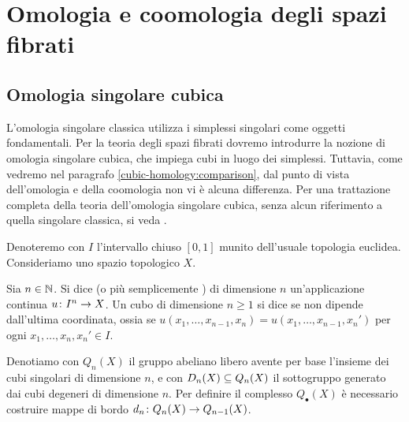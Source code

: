 \chapter{Omologia e coomologia degli spazi fibrati}
\label{ch:homology-and-cohomology-of-fibrations}
\section{Omologia singolare cubica}

L'omologia singolare classica utilizza i simplessi singolari come oggetti fondamentali. Per la teoria degli spazi fibrati dovremo introdurre la nozione di omologia singolare cubica, che impiega cubi in luogo dei simplessi. Tuttavia, come vedremo nel paragrafo \ref{cubic-homology:comparison}, dal punto di vista dell'omologia e della coomologia non vi è alcuna differenza. Per una trattazione completa della teoria dell'omologia singolare cubica, senza alcun riferimento a quella singolare classica, si veda \cite{massey}.

Denoteremo con $I$ l'intervallo chiuso $[0,1]$ munito dell'usuale topologia euclidea. Consideriamo uno spazio topologico $X$.

\begin{definition}
Sia $n\in\mathbb{N}$. Si dice  (o più semplicemente ) di dimensione $n$ un'applicazione continua $\map{u}{I^n}{X}$. Un cubo di dimensione $n\ge 1$ si dice  se non dipende dall'ultima coordinata, ossia se $u(x_1,\ldots,x_{n-1},x_n)=u(x_1,\ldots,x_{n-1},x_n')$ per ogni $x_1,\ldots,x_n,x_n'\in I$.
\end{definition}

Denotiamo con $Q_n(X)$ il gruppo abeliano libero avente per base l'insieme dei cubi singolari di dimensione $n$, e con $D_n(X)\subseteq Q_n(X)$ il sottogruppo generato dai cubi degeneri di dimensione $n$. Per definire il complesso $Q_\bullet(X)$ è necessario costruire mappe di bordo $\map{d_n}{Q_n(X)}{Q_{n-1}(X)}$.

